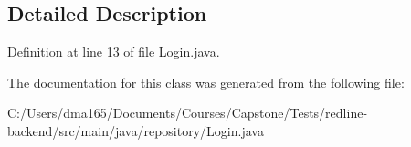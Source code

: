 \subsection{Detailed Description}


Definition at line 13 of file Login.\+java.



The documentation for this class was generated from the following file\+:\begin{DoxyCompactItemize}
\item 
C\+:/\+Users/dma165/\+Documents/\+Courses/\+Capstone/\+Tests/redline-\/backend/src/main/java/repository/Login.\+java\end{DoxyCompactItemize}
